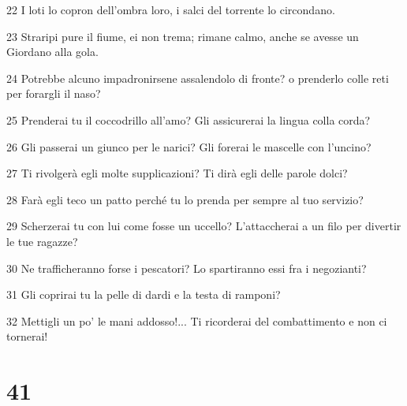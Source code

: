 \par 22 I loti lo copron dell'ombra loro, i salci del torrente lo circondano.
\par 23 Straripi pure il fiume, ei non trema; rimane calmo, anche se avesse un Giordano alla gola.
\par 24 Potrebbe alcuno impadronirsene assalendolo di fronte? o prenderlo colle reti per forargli il naso?
\par 25 Prenderai tu il coccodrillo all'amo? Gli assicurerai la lingua colla corda?
\par 26 Gli passerai un giunco per le narici? Gli forerai le mascelle con l'uncino?
\par 27 Ti rivolgerà egli molte supplicazioni? Ti dirà egli delle parole dolci?
\par 28 Farà egli teco un patto perché tu lo prenda per sempre al tuo servizio?
\par 29 Scherzerai tu con lui come fosse un uccello? L'attaccherai a un filo per divertir le tue ragazze?
\par 30 Ne trafficheranno forse i pescatori? Lo spartiranno essi fra i negozianti?
\par 31 Gli coprirai tu la pelle di dardi e la testa di ramponi?
\par 32 Mettigli un po' le mani addosso!... Ti ricorderai del combattimento e non ci tornerai!

\chapter{41}

